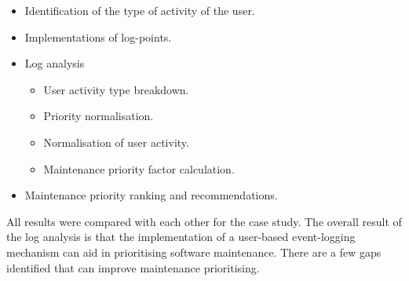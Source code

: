 \begin{itemize}
	\item Identification of the type of activity of the user.
	\item Implementations of log-points.
	\item Log analysis
		\begin{itemize}
			\item User activity type breakdown.
			\item Priority normalisation.
			\item Normalisation of user activity.
			\item Maintenance priority factor calculation.
		\end{itemize}
	\item Maintenance priority ranking and recommendations. 
\end{itemize}

All results were compared with each other for the case study. The overall result of the log analysis is that the implementation of a user-based event-logging mechanism can aid in prioritising software maintenance. There are a few gaps identified that can improve maintenance prioritising.

